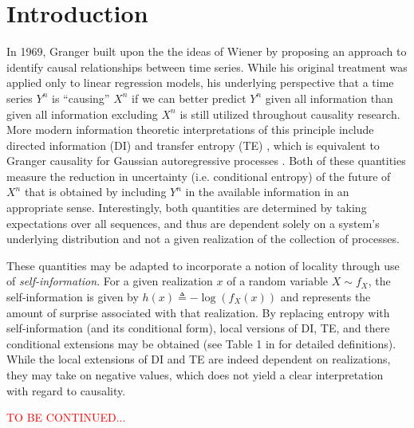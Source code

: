 \section{Introduction}

\begin{comment}
- Granger Causality
- Directed Information
- Transfer Entropy
- Local Transfer Entropy
- Sequential Prediction
- Argument for why sample path causality is important. Perhaps a neuroscientific argument that even if the model is time invariant, there may be certain patterns that induce a greater level of causal influence.
\end{itemize}}
\end{comment}

\cite{sancetta2012universality}

In 1969, Granger \cite{granger1969investigating} built upon the the ideas of Wiener by proposing an approach to identify causal relationships between time series. While his original treatment was applied only to linear regression models, his underlying perspective that a time series $Y^n$ is ``causing'' $X^n$ if we can better predict $Y^n$ given all information than given all information excluding $X^n$ is still utilized throughout causality research. More modern information theoretic interpretations of this principle include directed information (DI) \cite{marko1973bidirectional,massey1990causality} and transfer entropy (TE) \cite{schreiber2000measuring}, which is equivalent to Granger causality for Gaussian autoregressive processes \cite{barnett2009granger}. Both of these quantities measure the reduction in uncertainty (i.e. conditional entropy) of the future of $X^n$ that is obtained by including $Y^n$ in the available information in an appropriate sense. Interestingly, both quantities are determined by taking expectations over all sequences, and thus are dependent solely on a system's underlying distribution and not a given realization of the collection of processes.

These quantities may be adapted to incorporate a notion of locality through use of \emph{self-information}. For a given realization $x$ of a random variable $X\sim f_X$, the self-information is given by $h(x) \triangleq -\log(f_X(x))$ and represents the amount of surprise associated with that realization. By replacing entropy with self-information (and its conditional form), local versions of DI, TE, and there conditional extensions may be obtained (see Table 1 in \cite{lizier2014jidt} for detailed definitions). While the local extensions of DI and TE are indeed dependent on realizations, they may take on negative values, which does not yield a clear interpretation with regard to causality.

\textcolor{red}{TO BE CONTINUED...}